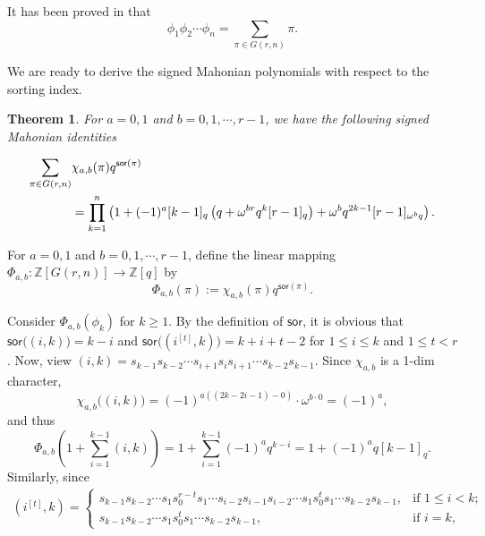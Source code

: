 \documentclass[a4paper, reqno, 11pt]{amsart}
\newtheorem{thm}[lem]{Theorem}
\newcommand{\sor}{{\textsf{sor}}}
\numberwithin{equation}{section}
\def\proof{\noindent{\bf Proof.\quad}}
\begin{document}
It has been proved in \cite{ELW_15} that 
\begin{equation}\label{eq:ELW_15}
\phi_1\phi_2\cdots\phi_n=\sum_{\pi\in G(r,n)}\pi.
\end{equation}

We are ready to derive the signed Mahonian polynomials with respect to the sorting index.

\begin{thm}\label{thm:sorting}
For $a=0,1$ and $b=0,1,\cdots, r-1$, we have the following signed Mahonian identities



\begin{align}
\sum_{\pi\in G(r,n)} & \chi_{a,b}(\pi)q^{\sor(\pi)} \notag \\ 
& = \prod_{k=1}^n \left( 1 + (-1)^a[k-1]_q\left( q + \omega^{br}q^k[r-1]_q \right) + \omega^b q^{2k-1}[r-1]_{\omega^b q} \right). \label{eq:r_sorting}
\end{align}
\end{thm}
\proof

For $a=0,1$ and $b=0,1,\cdots, r-1$, define the linear mapping $\Phi_{a,b}:\mathbb{Z}[G(r,n)]\to\mathbb{Z}[q]$ by $$\Phi_{a,b}(\pi):=\chi_{a,b}(\pi)q^{\sor(\pi)}.$$

Consider $\Phi_{a,b}(\phi_k)$ for $k\geq 1$.
By the definition of $\sor$, it is obvious that $\sor\big((i,k)\big)=k-i$ and $\sor\big((i^{[t]},k)\big)=k+i+t-2$ for $1\leq i\leq k$ and $1\leq t< r$.
Now, view $(i,k)=s_{k-1}s_{k-2}\cdots s_{i+1}s_is_{i+1}\cdots s_{k-2}s_{k-1}$.
Since $\chi_{a,b}$ is a 1-dim character, $$\chi_{a,b}\big((i,k)\big) = (-1)^{a((2k-2i-1)-0)}\cdot\omega^{b\cdot 0} = (-1)^a,$$
and thus 
\begin{equation}\label{eq:Phi_t=0}
\Phi_{a,b}\left( 1+\sum_{i=1}^{k-1}(i,k) \right) = 1 + \sum_{i=1}^{k-1}(-1)^aq^{k-i} = 1+(-1)^aq[k-1]_q.
\end{equation}
Similarly, since 
\begin{align*}
(i^{[t]},k)=\begin{cases}
s_{k-1}s_{k-2}\cdots s_1s_0^{r-t}s_1\cdots s_{i-2}s_{i-1}s_{i-2}\cdots s_1s_0^ts_1\cdots s_{k-2}s_{k-1}, & \text{if }1\leq i<k; \\
s_{k-1}s_{k-2}\cdots s_1s_0^{t}s_1\cdots s_{k-2}s_{k-1}, & \text{if }i=k,
\end{cases}
\end{align*}
\end{document}
